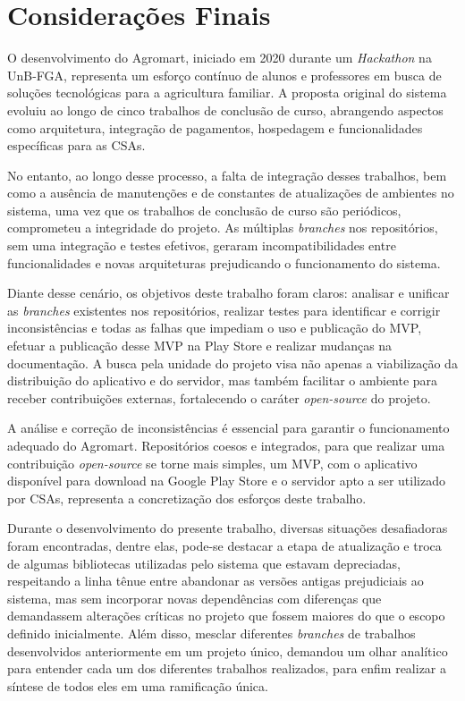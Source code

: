 \chapter[Considerações Finais]{Considerações Finais}

O desenvolvimento do Agromart, iniciado em 2020 durante um \textit{Hackathon} na UnB-FGA, representa um esforço contínuo de alunos e professores em busca de soluções tecnológicas para a agricultura familiar. A proposta original do sistema evoluiu ao longo de cinco trabalhos de conclusão de curso, abrangendo aspectos como arquitetura, integração de pagamentos, hospedagem e funcionalidades específicas para as CSAs.

No entanto, ao longo desse processo, a falta de integração desses trabalhos, bem como a ausência de manutenções e de constantes de atualizações de ambientes no sistema, uma vez que os trabalhos de conclusão de curso são periódicos, comprometeu a integridade do projeto. As múltiplas \textit{branches} nos repositórios, sem uma integração e testes efetivos, geraram incompatibilidades entre funcionalidades e novas arquiteturas prejudicando o funcionamento do sistema.

Diante desse cenário, os objetivos deste trabalho foram claros: analisar e unificar as \textit{branches} existentes nos repositórios, realizar testes para identificar e corrigir inconsistências e todas as falhas que impediam o uso e publicação do MVP, efetuar a publicação desse MVP na Play Store e realizar mudanças na documentação. A busca pela unidade do projeto visa não apenas a viabilização da distribuição do aplicativo e do servidor, mas também facilitar o ambiente para receber contribuições externas, fortalecendo o caráter \textit{open-source} do projeto.

A análise e correção de inconsistências é essencial para garantir o funcionamento adequado do Agromart. Repositórios coesos e integrados, para que realizar uma contribuição \textit{open-source} se torne mais simples, um MVP, com o aplicativo disponível para download na Google Play Store e o servidor apto a ser utilizado por CSAs, representa a concretização dos esforços deste trabalho.

Durante o desenvolvimento do presente trabalho, diversas situações desafiadoras foram encontradas, dentre elas, pode-se destacar a etapa de atualização e troca de algumas bibliotecas utilizadas pelo sistema que estavam depreciadas, respeitando a linha tênue entre abandonar as versões antigas prejudiciais ao sistema, mas sem incorporar novas dependências com diferenças que demandassem alterações críticas no projeto que fossem maiores do que o escopo definido inicialmente. Além disso, mesclar diferentes \textit{branches} de trabalhos desenvolvidos anteriormente em um projeto único, demandou um olhar analítico para entender cada um dos diferentes trabalhos realizados, para enfim realizar a síntese de todos eles em uma ramificação única.

